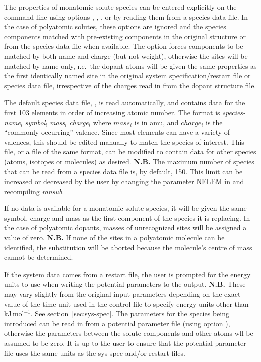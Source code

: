 \documentclass[a4paper,twoside]{report}
\begin{document}
The properties of monatomic solute species can be entered explicitly on the command
line using options , , , or by reading them
from a species data file. In the case of polyatomic solutes, these options are ignored and the species components
matched with pre-existing components in the original structure or from the species data file when available. The  option
forces components to be matched by both name and charge (but not weight), otherwise 
the sites will be matched by name only, \i.e.\ the dopant atoms will be given the same properties as the first
identically named site in the original system specification/restart file or species data file, irrespective 
of the charges read in from the dopant structure file.

 The default species data file,
, is read automatically, and contains data for the
first 103 elements in order of increasing atomic number. The format is
{\textit{species-name}$_{i}$ %
                  \textit{symbol}$_{i}$ \textit{mass}$_{i}$} \textit{charge}$_{i}$
where $mass_{i}$ is in amu, and $charge_{i}$ is the ``commonly occurring'' valence.
Since most elements can have a variety of valences, this
should be edited manually to match the species of interest. This file,
or a file of the same format, can be
modified to contain data for other species (atoms, isotopes or molecules)
as desired. \textbf{N.B.} The maximum number of species that can be
read from a species data file is, by default, 150. This limit can be
increased or decreased by the user by changing the parameter NELEM in
 and recompiling \emph{ransub}.

If no data is available for a monatomic solute species, it
will be given the same symbol, charge and mass as the first component
of the species it is replacing. In the case of polyatomic dopants,
masses of unrecognized sites will be assigned a value of zero. \textbf{N.B.}
If none of the sites in a polyatomic molecule can be identified, the substitution will
be aborted because the molecule's centre of mass cannot be determined.

If the system data comes from a restart file, the user is prompted for
the energy units to use when writing the potential parameters to the
output. \textbf{N.B.} These may vary slightly from the original
input parameters depending on the exact value of the time-unit used
in the control file to specify energy units other than kJ\,mol$^{-1}$. See
section~\ref{sec:sys-spec}. The parameters for the species being introduced
can be read in from a potential parameter file (using option ),
otherwise the parameters between the solute components and
other atoms wll be assumed to be zero. It is up to the user to ensure that
the potential parameter file uses the same units as the sys-spec and/or restart
files.
\end{document}
